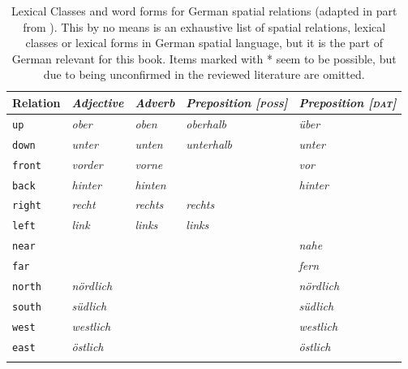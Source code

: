 \begin{table}
\label{t:lexical-class-word-forms}
\caption[Lexical Classes and word forms for German spatial relations]
{Lexical Classes and word forms for German spatial relations 
(adapted in part from \citealp{tenbrink2007space}). This by no means
is an exhaustive list of spatial relations, lexical classes or lexical forms 
in German spatial language, but it is the part of German relevant for 
this book. Items marked with * seem to be possible, but due to being
unconfirmed in the reviewed literature are omitted.\newline}
\begin{tabular}{l>{\itshape}l>{\itshape}l>{\itshape}l>{\itshape}l}
\lsptoprule
Relation & \upshape Adjective & \upshape Adverb & \upshape Preposition [\textsc{poss}] & \upshape Preposition [\textsc{dat}] \\\midrule
{\footnotesize\tt up} & ober & oben & oberhalb & {\"u}ber \\%
{\footnotesize\tt down} & unter & unten & unterhalb & unter\\%
{\footnotesize\tt front} & vorder & vorne & \multicolumn{1}{c}{\upshape --} & vor \\%
{\footnotesize\tt back}  & hinter & hinten  & \multicolumn{1}{c}{\upshape --} & hinter\\%
{\footnotesize\tt right} & recht & rechts  & rechts & \multicolumn{1}{c}{\upshape --} \\%
{\footnotesize\tt left} & link & links & links & \multicolumn{1}{c}{\upshape --} \\%
{\footnotesize\tt near} & \multicolumn{1}{c}{\upshape *} & \multicolumn{1}{c}{\upshape --} & \multicolumn{1}{c}{\upshape --} & nahe \\%
{\footnotesize\tt far} & \multicolumn{1}{c}{\upshape *} & \multicolumn{1}{c}{\upshape --} & \multicolumn{1}{c}{\upshape --} & fern \\%
{\footnotesize\tt north}  & n\"ordlich & \multicolumn{1}{c}{\upshape *} & \multicolumn{1}{c}{\upshape *} & n\"ordlich \\%
{\footnotesize\tt south} & s\"udlich & \multicolumn{1}{c}{\upshape *} & \multicolumn{1}{c}{\upshape *} & s\"udlich \\%
{\footnotesize\tt west} & westlich & \multicolumn{1}{c}{\upshape *} & \multicolumn{1}{c}{\upshape *} & westlich \\%
{\footnotesize\tt east} & \"ostlich & \multicolumn{1}{c}{\upshape *} & \multicolumn{1}{c}{\upshape *} & \"ostlich \\%
\lspbottomrule
\end{tabular}
\end{table}

